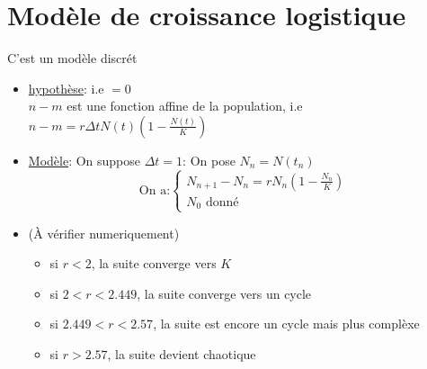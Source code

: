 \section{Modèle de croissance logistique}
C'est un modèle discrét
\begin{itemize}
    \item \underline{hypothèse}: i.e $= 0$\\
         $n - m$ est une fonction affine de la population,  i.e $n - m = r \Delta t N(t)( 1 - \frac{N(t)}{K} )$ 
    \item \underline{Modèle}: On suppose $\Delta t = 1$: On pose  $N_n = N(t_n)$
         \[
        \text{On a:} \begin{cases}
            N_{n+1} - N_n = r N_n (1 - \frac{N_n}{K})\\
            N_0 \text{ donné}
        \end{cases}
        \] 
    \item 
        \begin{property} (À vérifier numeriquement) 
            \begin{itemize}
                \item si $r < 2$, la suite converge vers  $K$ 
                \item si  $2 < r < 2.449$, la suite converge vers un cycle
                \item si  $2.449 < r < 2.57$, la suite est encore un cycle mais plus complèxe
                \item si  $r > 2.57$, la suite devient chaotique
            \end{itemize}
        \end{property}
\end{itemize}
